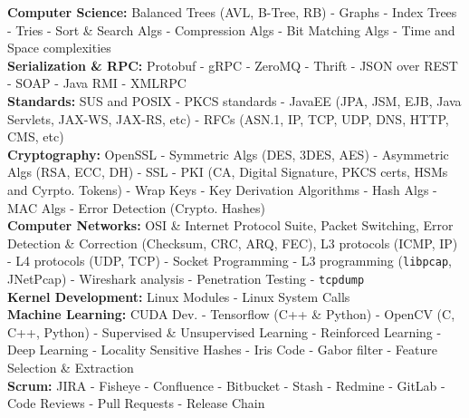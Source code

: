 \documentclass[10pt,a4paper]{article}
\begin{document}
\textbullet \hspace{0.1cm}\textbf{Computer Science:} Balanced Trees (AVL, B-Tree, RB) - Graphs - Index Trees - Tries - Sort \& Search Algs - Compression Algs - Bit Matching Algs - Time and Space complexities  \\
\textbullet \hspace{0.1cm}\textbf{Serialization \& RPC:} Protobuf - gRPC - ZeroMQ - Thrift - JSON over REST - SOAP - Java RMI - XMLRPC \\
\textbullet \hspace{0.1cm}\textbf{Standards:} SUS and POSIX - PKCS standards - JavaEE (JPA, JSM, EJB, Java Servlets, JAX-WS, JAX-RS, etc) - RFCs (ASN.1, IP, TCP, UDP, DNS, HTTP, CMS, etc) \\
\textbullet \hspace{0.1cm}\textbf{Cryptography:} OpenSSL - Symmetric Algs (DES, 3DES, AES) - Asymmetric Algs (RSA, ECC, DH) - SSL - PKI (CA, Digital Signature, PKCS certs, HSMs and Cyrpto. Tokens) - Wrap Keys - Key Derivation Algorithms - Hash Algs - MAC Algs - Error Detection (Crypto. Hashes)  \\ 
\textbullet \hspace{0.1cm}\textbf{Computer Networks:} OSI \& Internet Protocol Suite, Packet Switching, Error Detection \& Correction (Checksum, CRC, ARQ, FEC), L3 protocols (ICMP, IP) - L4 protocols (UDP, TCP) - Socket Programming - L3 programming (\texttt{libpcap}, JNetPcap) - Wireshark analysis - Penetration Testing - \texttt{tcpdump} \\
\textbullet \hspace{0.1cm}\textbf{Kernel Development:} Linux Modules - Linux System Calls \\
\textbullet \hspace{0.1cm}\textbf{Machine Learning:} CUDA Dev. - Tensorflow (C++ \& Python) - OpenCV (C, C++, Python) - Supervised \& Unsupervised Learning - Reinforced Learning - Deep Learning - Locality Sensitive Hashes - Iris Code - Gabor filter - Feature Selection \& Extraction \\
\textbullet \hspace{0.1cm}\textbf{Scrum:} JIRA - Fisheye - Confluence - Bitbucket - Stash - Redmine - GitLab -Code Reviews - Pull Requests - Release Chain
\end{document}
